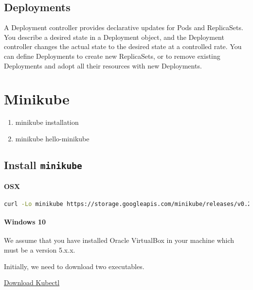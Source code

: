 \subsection{Deployments}\label{deployments}

A Deployment controller provides declarative updates for Pods and
ReplicaSets. You describe a desired state in a Deployment object, and
the Deployment controller changes the actual state to the desired state
at a controlled rate. You can define Deployments to create new
ReplicaSets, or to remove existing Deployments and adopt all their
resources with new Deployments.

\section{Minikube}

\begin{enumerate}
\item
  minikube installation
\item
  minikube hello-minikube
\end{enumerate}

\subsection{\texorpdfstring{Install
\texttt{minikube}}{Install minikube}}\label{install-minikube}

\paragraph{OSX}\label{osx}

\begin{lstlisting}[language=bash]
curl -Lo minikube https://storage.googleapis.com/minikube/releases/v0.25.0/minikube-darwin-amd64 && chmod +x minikube && sudo mv minikube /usr/local/bin/
\end{lstlisting}

\paragraph{Windows 10}\label{windows-10}

We assume that you have installed Oracle VirtualBox in your machine
which must be a version 5.x.x.

Initially, we need to download two executables.

\href{http://storage.googleapis.com/kubernetes-release/release/v1.4.0/bin/windows/amd64/kubectl.exe}{Download
Kubectl}


